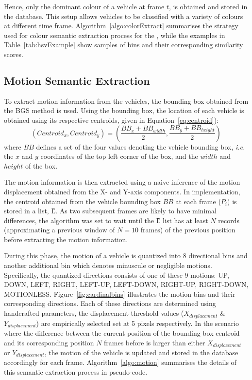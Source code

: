 Hence, only the dominant colour of a vehicle at frame $t$, is obtained and stored in the database. This setup allows vehicles to be classified with a variety of colours at different time frame.
Algorithm~\ref{algo:colorExtract} summarises the strategy used for colour semantic extraction process for the \versionOneExt,
while the examples in Table~\ref{tab:hsvExample} show samples of bins and their corresponding similarity scores.

\subsection{Motion Semantic Extraction}
\label{subsec:motions9binextract}

To extract motion information from the vehicles, the bounding box obtained from the BGS method is used.
Using the bounding box, the location of each vehicle is obtained using its respective centroids, given in Equation~\ref{eq:centroid}):
\begin{equation}
\label{eq:centroid}
(Centroid_x, Centroid_y) = (\frac{BB_{x}+BB_{width}}{2} , \frac{BB_{y}+BB_{height}}{2})
\end{equation}
where $BB$ defines a set of the four values denoting the vehicle bounding box, \emph{i.e.} the $x$ and $y$ coordinates of the top left corner of the box, and the $width$ and $height$ of the box.

The motion information is then extracted using a naive inference of the motion displacement obtained from the X- and Y-axis components. In implementation, the centroid obtained from the vehicle bounding box $BB$ at each frame ($P_i$) is stored in a list, \H{L}.
As two subsequent frames are likely to have minimal differences, the algorithm was set to wait until the \H{L} list has at least $N$ records (approximating a previous window of $N=10$ frames) of the previous position before extracting the motion information.

During this phase, the motion of a vehicle is quantized into 8 directional bins and another additional bin which denotes minuscule or negligible motions.
Specifically, the quantized directions consists of one of these 9 motions: UP, DOWN, LEFT, RIGHT, LEFT-UP, LEFT-DOWN, RIGHT-UP, RIGHT-DOWN, MOTIONLESS.
Figure~\ref{fig:cardinalbins} illustrates the motion bins and their corresponding directions.
Each of these directions are determined using handcrafted parameters, the displacement threshold values ($X_{displacement}$ \& $Y_{displacement}$) are empirically selected set at 5 pixels respectively.
In the scenario where the difference between the current position of the bounding box centroid and its corresponding position $N$ frames before is larger than either $X_{displacement}$ or $Y_{displacement}$, the motion of the vehicle is updated and stored in the database accordingly for each frame. Algorithm~\ref{algo:motion} summarises the details of this semantic extraction process in pseudo-code.

